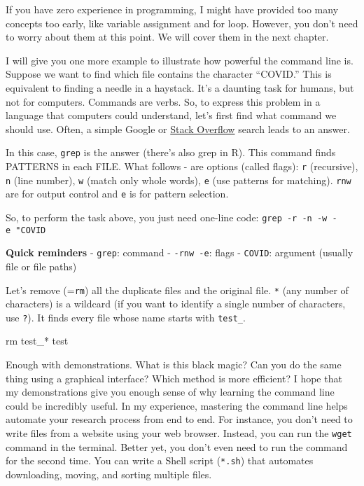 \documentclass[
  letterpaper,
  DIV=11,
  numbers=noendperiod]{scrreprt}
\newenvironment{Shaded}{\begin{snugshade}}{\end{snugshade}}
\newcommand{\FunctionTok}[1]{\textcolor[rgb]{0.28,0.35,0.67}{#1}}
\newcommand{\NormalTok}[1]{\textcolor[rgb]{0.00,0.23,0.31}{#1}}
\newcommand{\PreprocessorTok}[1]{\textcolor[rgb]{0.68,0.00,0.00}{#1}}
\begin{document}
If you have zero experience in programming, I might have provided too
many concepts too early, like variable assignment and for loop. However,
you don't need to worry about them at this point. We will cover them in
the next chapter.

I will give you one more example to illustrate how powerful the command
line is. Suppose we want to find which file contains the character
``COVID.'' This is equivalent to finding a needle in a haystack. It's a
daunting task for humans, but not for computers. Commands are verbs. So,
to express this problem in a language that computers could understand,
let's first find what command we should use. Often, a simple Google or
\href{https://stackoverflow.com/}{Stack Overflow} search leads to an
answer.

In this case, \texttt{grep} is the answer (there's also grep in R). This
command finds PATTERNS in each FILE. What follows - are options (called
flags): \texttt{r} (recursive), \texttt{n} (line number), \texttt{w}
(match only whole words), \texttt{e} (use patterns for matching).
\texttt{rnw} are for output control and \texttt{e} is for pattern
selection.

So, to perform the task above, you just need one-line code:
\texttt{grep\ -r\ -n\ -w\ -e\ "COVID\textquotesingle{}\textquotesingle{}}

\textbf{Quick reminders} - \texttt{grep}: command - \texttt{-rnw\ -e}:
flags - \texttt{COVID}: argument (usually file or file paths)

Let's remove (=\texttt{rm}) all the duplicate files and the original
file. \texttt{*} (any number of characters) is a wildcard (if you want
to identify a single number of characters, use \texttt{?}). It finds
every file whose name starts with \texttt{test\_}.

\begin{Shaded}
\begin{Highlighting}[]
\FunctionTok{rm}\NormalTok{ test\_}\PreprocessorTok{*}\NormalTok{ test }
\end{Highlighting}
\end{Shaded}

Enough with demonstrations. What is this black magic? Can you do the
same thing using a graphical interface? Which method is more efficient?
I hope that my demonstrations give you enough sense of why learning the
command line could be incredibly useful. In my experience, mastering the
command line helps automate your research process from end to end. For
instance, you don't need to write files from a website using your web
browser. Instead, you can run the \texttt{wget} command in the terminal.
Better yet, you don't even need to run the command for the second time.
You can write a Shell script (\texttt{*.sh}) that automates downloading,
moving, and sorting multiple files.
\end{document}
